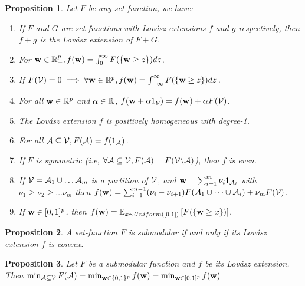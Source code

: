 \documentclass[11pt]{article}
\newtheorem{proposition}{Proposition}{\bf}{\it}
\begin{document}
\begin{proposition}
Let $F$ be any set-function, we have:
\begin{enumerate}
  \item If $F$ and $G$ are set-functions with Lovász extensions $f$ and $g$ respectively, then
  $f + g$ is the Lovász extension of $F + G$.
  \item For ${\bf w} \in {\mathbb R}_+^{p}, f({\bf w}) = \int_{0}^{\infty}F(\{{\bf w} \geq z\})dz$.
  \item If $F({\cal V}) = 0 \implies \forall {\bf w} \in {\mathbb R}^{p}, f({\bf w}) = \int_{-\infty}^{\infty}F(\{{\bf w} \geq z\})dz$.
  \item For all ${\bf w} \in {\mathbb R}^p$ and $\alpha \in {\mathbb R}$, $f({\bf w} + \alpha 1_{{\cal V}}) = f({\bf w}) + \alpha F({\cal V})$.
  \item The Lovász extension $f$ is positively homogeneous with degree-1.
  \item For all ${\cal A} \subseteq {\cal V}, F({\cal A}) = f(1_{{\cal A}})$.
  \item If $F$ is symmetric (i.e, $\forall {\cal A} \subseteq {\cal V}, F({\cal A}) = F({\cal V} \backslash {\cal A})$), then $f$ is even.
  \item If ${\cal V} = {\cal A}_1 \cup \dots {\cal A}_m$ is a partition of ${\cal V}$, and ${\bf w} = \sum_{i=1}^{m}\nu_i 1_{{\cal A}_i}$ with
  $\nu_1 \geq \nu_2 \geq \dots \nu_m$ then $f({\bf w}) = \sum_{i=1}^{m-1}(\nu_i - \nu_{i+1})F({\cal A}_1 \cup \dots \cup {\cal A}_i) + \nu_mF({\cal V})$.
  \item If ${\bf w} \in [0, 1]^p$, then $f({\bf w}) = \mathbb{E}_{x \sim Uniform([0, 1])}\left[F(\{{\bf w} \geq x\})\right]$.
\end{enumerate}
\end{proposition}

\begin{proposition}
A set-function $F$ is submodular if and only if its Lovász extension $f$ is convex.
\end{proposition}


\begin{proposition}
Let $F$ be a submodular function and $f$ be its Lovász extension. 
Then $\min_{{\cal A} \subseteq {\cal V}}F({\cal A}) = \min_{{\bf w} \in \{0, 1\}^{p}}f({\bf w}) = \min_{{\bf w} \in [0, 1]^{p}}f({\bf w})$
\end{proposition}
\end{document}
